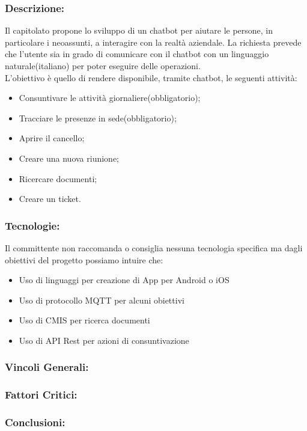 \subsubsection{Descrizione:}
Il capitolato propone lo sviluppo di un chatbot per aiutare le persone, in particolare i neoassunti, a interagire con la realtà aziendale.
La richiesta prevede che l’utente sia in grado di comunicare con il chatbot con un linguaggio naturale(italiano) per poter eseguire delle operazioni. \\
L’obiettivo è quello di rendere disponibile, tramite chatbot, le seguenti attività:
\begin{itemize}
	\item Consuntivare le attività giornaliere(obbligatorio);
	\item Tracciare le presenze in sede(obbligatorio);
	\item Aprire il cancello;
	\item Creare una nuova riunione;
	\item Ricercare documenti;
	\item Creare un ticket.
	
\end{itemize}

\subsubsection{Tecnologie:}
Il committente non raccomanda o consiglia nessuna tecnologia specifica ma dagli obiettivi del progetto possiamo intuire che:
\begin{itemize}
	\item Uso di linguaggi per creazione di App per Android o iOS
	\item Uso di protocollo MQTT per alcuni obiettivi
	\item Uso di CMIS per ricerca documenti
	\item Uso di API Rest per azioni di consuntivazione  
\end{itemize}

\subsubsection{Vincoli Generali:}

\subsubsection{Fattori Critici:}

\subsubsection{Conclusioni:}